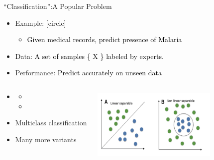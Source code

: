 \documentclass[aspectratio=169,14pt]{beamer}
\begin{document}
\begin{frame}[t]{“Classification”:A Popular Problem}
	\vspace{-0.7cm}
	\begin{itemize}
\item \alert{Example:}
[circle]
\begin{itemize}
  \item \textcolor{black}{Given medical records, predict presence of Malaria}
\end{itemize}
\end{itemize}
\begin{itemize}
\item \textcolor{black}{\alert{Data:}  A set of samples \{ X \} labeled by experts.}
\item \alert{Performance:} \textcolor{black}{Predict accurately on unseen data}
\end{itemize}
	\begin{columns}
	\begin{itemize}
		\item {}
		\begin{itemize}
[circle]
		 \item \hspace{2pt}{\textcolor{black}{“Yes” or “No”}}
                 \item {}
\end{itemize}
\item \alert{Multiclass classification}
\item \alert{Many more variants}
\end{itemize}
		 \includegraphics[width=6cm ,height=3.5cm]{Images/demystifying_linear.png}
	\end{columns}
\end{frame}
\end{document}
